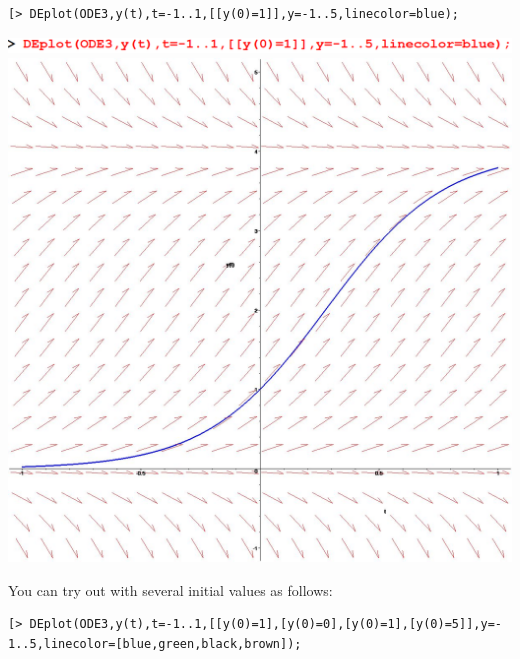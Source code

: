 \documentclass[
]{book}
\theoremstyle{definition}
\theoremstyle{definition}
\theoremstyle{definition}
\theoremstyle{definition}
\theoremstyle{remark}
\begin{document}
\begin{verbatim}
[> DEplot(ODE3,y(t),t=-1..1,[[y(0)=1]],y=-1..5,linecolor=blue);
\end{verbatim}

\includegraphics{figures/Diff/Diff 6.2 -12.png}
\includegraphics{figures/Diff/Diff 6.2 -12.jpg}

You can try out with several initial values as follows:

\begin{verbatim}
[> DEplot(ODE3,y(t),t=-1..1,[[y(0)=1],[y(0)=0],[y(0)=1],[y(0)=5]],y=-
1..5,linecolor=[blue,green,black,brown]);
\end{verbatim}
\end{document}

